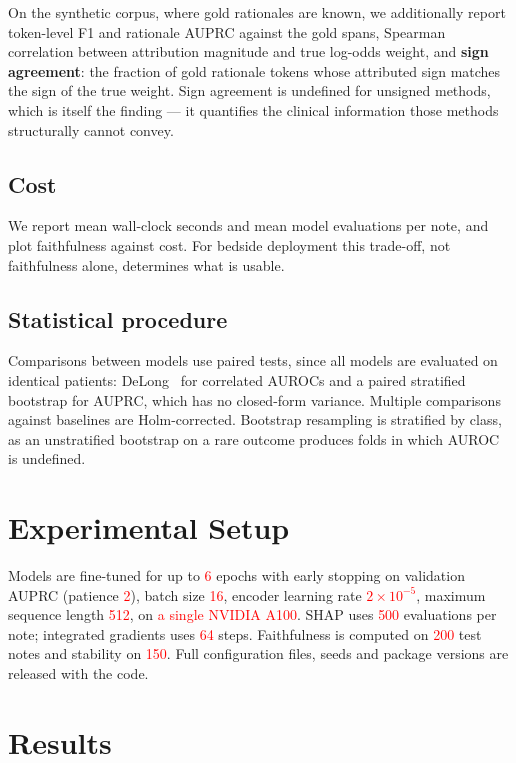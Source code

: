 \documentclass[conference]{IEEEtran}
\newif\ifdraftnums\draftnumstrue   %
\newcommand{\ph}[1]{\ifdraftnums\textcolor{red}{#1}\else#1\fi}
\begin{document}
On the synthetic corpus, where gold rationales are known, we additionally report
token-level F1 and rationale AUPRC against the gold spans, Spearman correlation
between attribution magnitude and true log-odds weight, and \textbf{sign
agreement}: the fraction of gold rationale tokens whose attributed sign matches
the sign of the true weight. Sign agreement is undefined for unsigned methods,
which is itself the finding --- it quantifies the clinical information those
methods structurally cannot convey.

\subsection{Cost}
We report mean wall-clock seconds and mean model evaluations per note, and plot
faithfulness against cost. For bedside deployment this trade-off, not
faithfulness alone, determines what is usable.

\subsection{Statistical procedure}
Comparisons between models use paired tests, since all models are evaluated on
identical patients: DeLong~\cite{delong1988} for correlated AUROCs and a paired
stratified bootstrap for AUPRC, which has no closed-form variance. Multiple
comparisons against baselines are Holm-corrected. Bootstrap resampling is
stratified by class, as an unstratified bootstrap on a rare outcome produces
folds in which AUROC is undefined.

\section{Experimental Setup}

Models are fine-tuned for up to \ph{6} epochs with early stopping on validation
AUPRC (patience \ph{2}), batch size \ph{16}, encoder learning rate
\ph{$2\times10^{-5}$}, maximum sequence length \ph{512}, on \ph{a single NVIDIA
A100}. SHAP uses \ph{500} evaluations per note; integrated gradients uses
\ph{64} steps. Faithfulness is computed on \ph{200} test notes and stability on
\ph{150}. Full configuration files, seeds and package versions are released with
the code.

\section{Results}
\end{document}
